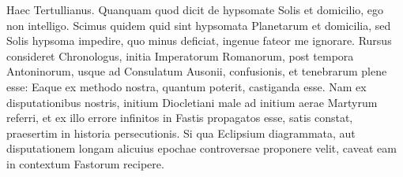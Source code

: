 \begin{parnumbers}
\lnr{}Haec Tertullianus.
\lnr{}Quanquam quod dicit de hypsomate Solis
et domicilio, ego non intelligo.
\lnr{}Scimus quidem quid sint hypsomata
Planetarum et domicilia, sed Solis hypsoma impedire, quo minus
deficiat, ingenue fateor me ignorare.
\lnr{}Rursus consideret Chronologus,
initia Imperatorum Romanorum, post tempora Antoninorum,
usque ad Consulatum Ausonii, confusionis, et tenebrarum plene esse:
\lnr{}Eaque ex methodo nostra, quantum poterit, castiganda esse.
\lnr{}Nam ex disputationibus
nostris, initium Diocletiani male ad initium aerae Martyrum
referri, et ex illo errore infinitos in Fastis propagatos esse, satis
constat, praesertim in historia persecutionis.
\lnr{}Si qua Eclipsium diagrammata,
aut disputationem longam alicuius epochae controversae proponere
velit, caveat eam in contextum Fastorum recipere.


\end{parnumbers}
